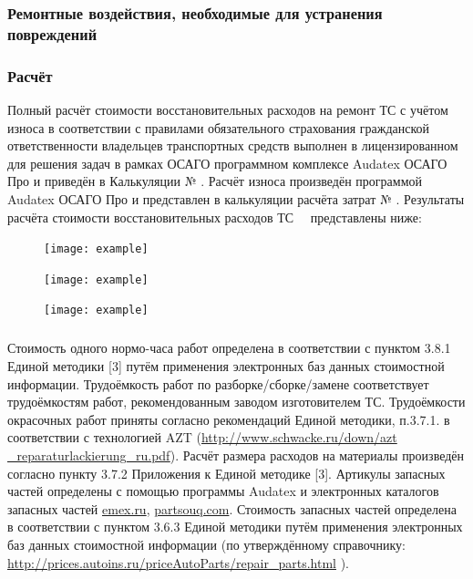 \subsubsection{Ремонтные воздействия, необходимые для устранения повреждений}
 
%
\subsubsection{ Расчёт}
    
\indent Полный расчёт стоимости восстановительных расходов на ремонт ТС с учётом износа в соответствии с правилами обязательного страхования гражданской ответственности владельцев транспортных средств выполнен в  лицензированном для решения задач в рамках ОСАГО программном комплексе   Audatex ОСАГО Про и приведён в Калькуляции № \NomerDoc.
 Расчёт износа произведён программой  Audatex ОСАГО Про и представлен  в калькуляции расчёта затрат № \NomerDoc.
\indent Результаты расчёта  стоимости восстановительных расходов ТС \, \, представлены ниже:\\
  
  
\begin{figure}[H]
        	\centering
        	\texttt{[image: example]}
        \end{figure}
  
    \begin{figure}[H]
    	\centering
    	\texttt{[image: example]}
    \end{figure}
    \begin{figure}[H]
    	\centering
    	\texttt{[image: example]}
    \end{figure}
    \medskip
    \renewcommand\baselinestretch{1.2}\small\normalsize
    

\subparagraph{}Стоимость одного нормо-часа работ определена в соответствии с пунктом 3.8.1 Единой методики [3] путём применения электронных баз данных стоимостной информации.
Трудоёмкость работ по разборке/сборке/замене  соответствует трудоёмкостям работ, рекомендованным заводом изготовителем ТС. Трудоёмкости окрасочных работ приняты согласно рекомендаций Единой методики, п.3.7.1. в соответствии с технологией  AZT (\url{http://www.schwacke.ru/down/azt _reparaturlackierung_ru.pdf}). Расчёт размера расходов на материалы произведён  согласно пункту 3.7.2 Приложения к Единой методике [3]. Артикулы запасных частей определены с помощью программы Audatex и электронных  каталогов запасных частей \url{emex.ru}, \url{partsouq.com}.
Стоимость запасных частей определена в соответствии с пунктом 3.6.3 Единой методики путём применения электронных баз данных стоимостной информации (по утверждённому справочнику: \url{http://prices.autoins.ru/priceAutoParts/repair_parts.html} ).
  
